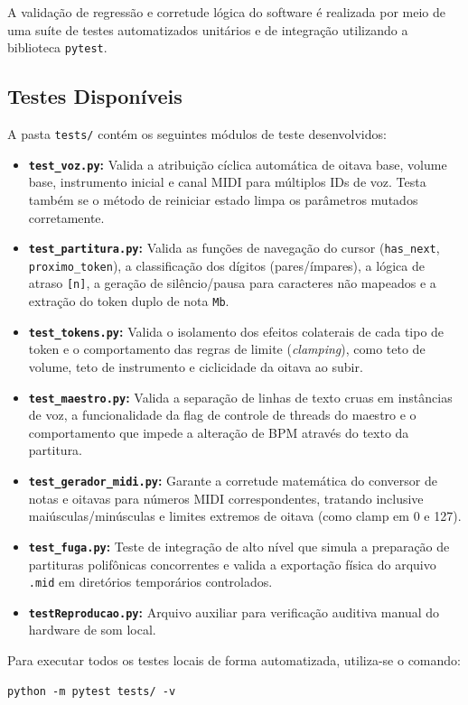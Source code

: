 \documentclass[12pt, a4paper]{article}
\begin{document}
A validação de regressão e corretude lógica do software é realizada por meio de uma suíte de testes automatizados unitários e de integração utilizando a biblioteca \texttt{pytest}.

\subsection{Testes Disponíveis}
A pasta \texttt{tests/} contém os seguintes módulos de teste desenvolvidos:
\begin{itemize}
  \item \textbf{\texttt{test\_voz.py}:} Valida a atribuição cíclica automática de oitava base, volume base, instrumento inicial e canal MIDI para múltiplos IDs de voz. Testa também se o método de reiniciar estado limpa os parâmetros mutados corretamente.
  \item \textbf{\texttt{test\_partitura.py}:} Valida as funções de navegação do cursor (\texttt{has\_next}, \texttt{proximo\_token}), a classificação dos dígitos (pares/ímpares), a lógica de atraso \texttt{[n]}, a geração de silêncio/pausa para caracteres não mapeados e a extração do token duplo de nota \texttt{Mb}.
  \item \textbf{\texttt{test\_tokens.py}:} Valida o isolamento dos efeitos colaterais de cada tipo de token e o comportamento das regras de limite (\textit{clamping}), como teto de volume, teto de instrumento e ciclicidade da oitava ao subir.
  \item \textbf{\texttt{test\_maestro.py}:} Valida a separação de linhas de texto cruas em instâncias de voz, a funcionalidade da flag de controle de threads do maestro e o comportamento que impede a alteração de BPM através do texto da partitura.
  \item \textbf{\texttt{test\_gerador\_midi.py}:} Garante a corretude matemática do conversor de notas e oitavas para números MIDI correspondentes, tratando inclusive maiúsculas/minúsculas e limites extremos de oitava (como clamp em 0 e 127).
  \item \textbf{\texttt{test\_fuga.py}:} Teste de integração de alto nível que simula a preparação de partituras polifônicas concorrentes e valida a exportação física do arquivo \texttt{.mid} em diretórios temporários controlados.
  \item \textbf{\texttt{testReproducao.py}:} Arquivo auxiliar para verificação auditiva manual do hardware de som local.
\end{itemize}

Para executar todos os testes locais de forma automatizada, utiliza-se o comando:
\begin{verbatim}
python -m pytest tests/ -v
\end{verbatim}
\end{document}
